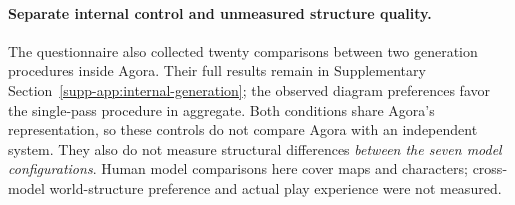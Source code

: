 \paragraph{Separate internal control and unmeasured structure quality.}
The questionnaire also collected twenty comparisons between two generation
procedures inside Agora. Their full results remain in
Supplementary Section~\ref{supp-app:internal-generation}; the observed diagram preferences favor
the single-pass procedure in aggregate. Both conditions share Agora's
representation, so these controls do not compare Agora with an independent
system. They also do not measure structural differences \emph{between the
seven model configurations}. Human model comparisons here cover maps and
characters; cross-model world-structure preference and actual play experience
were not measured.
